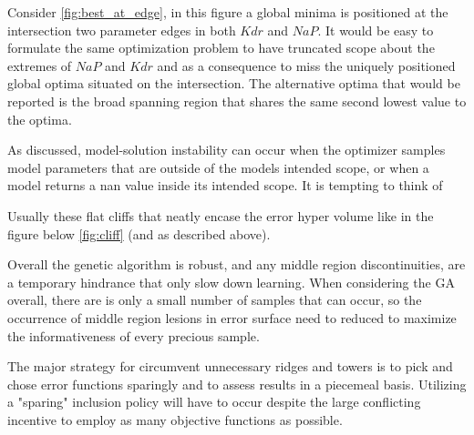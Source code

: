 Consider \ref{fig:best_at_edge}, in this figure a global minima is positioned at the intersection two parameter edges in both $Kdr$ and $NaP$. It would be easy to formulate the same optimization problem to have truncated scope about the extremes of $NaP$ and $Kdr$ and as a consequence to miss the uniquely positioned global optima situated on the intersection. The alternative optima that would be reported is the broad spanning region that shares the same second lowest value to the optima. 

As discussed, model-solution instability can occur when the optimizer samples model parameters that are outside of the models intended scope, or when a model returns a nan value inside its intended scope. It is tempting to think of 

Usually these flat cliffs that neatly encase the error hyper volume like in the figure below \ref{fig:cliff} (and as described above).


Overall the genetic algorithm is robust, and any middle region discontinuities, are a temporary hindrance that only slow down learning. When considering the GA overall, there are is only a small number of samples that can occur, so the occurrence of middle region lesions in error surface need to reduced  to maximize the informativeness of every precious sample. 

The major strategy for circumvent unnecessary ridges and towers is to pick and chose error functions sparingly and to assess results in a piecemeal basis. Utilizing a "sparing" inclusion policy will have to occur despite the large conflicting incentive to employ as many objective functions as possible.



